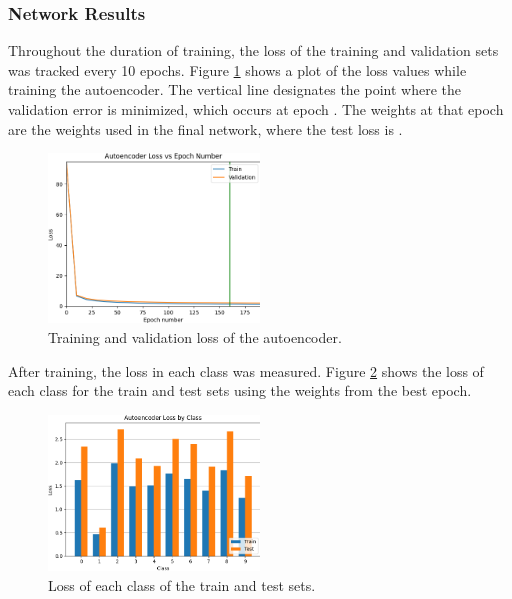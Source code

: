 \documentclass[a4paper, 12pt, titlepage]{article}
\newcommand{\figRef}[1]{Figure \ref{#1}}
\begin{document}
  \subsubsection{Network Results}
  \par Throughout the duration of training, the loss of the training and
  validation sets was tracked every 10 epochs.
  \figRef{fig:auto_loss} shows a plot of the loss values while training the
  autoencoder.
  The vertical line designates the point where the validation error is
  minimized, which occurs at epoch
  \unskip{}.
  The weights at that epoch are the weights used in the final network, where
  the test loss is \unskip{}.
  \begin{figure}[htb]
    \centering
    \includegraphics[width=0.5\textwidth]{images/auto_loss.png}
    \caption{Training and validation loss of the autoencoder.}
    \label{fig:auto_loss}
  \end{figure}
  \par After training, the loss in each class was measured.
  \figRef{fig:bar} shows the loss of each class for the train and
  test sets using the weights from the best epoch.
  \begin{figure}[htb]
    \centering
    \includegraphics[width=0.5\textwidth]{images/loss_bar_plot.png}
    \caption{Loss of each class of the train and test sets.}
    \label{fig:bar}
  \end{figure}
\end{document}
